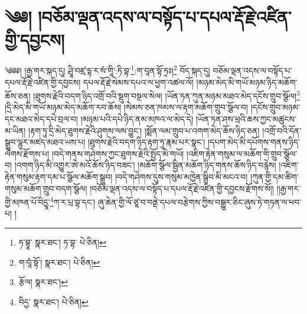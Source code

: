 \setcounter{footnote}{0} 
\chapter{༄༅། །བཅོམ་ལྡན་འདས་ལ་བསྟོད་པ་དཔལ་རྡོ་རྗེ་འཛིན་གྱི་དབྱངས།}༄༅༅། །རྒྱ་གར་སྐད་དུ། ཤྲཱི་བཛྲ་དྷ་ར་སཾ་གཱི་:ཏི་བྷ་\footnote{ཏ་བྷཱ་  སྣར་ཐང་། ཏ་བྷ་  པེ་ཅིན། }:ག་བཱན་སྟོ་ཏྲཿ།\footnote{ག་བཱཾ་སྟོ་།  སྣར་ཐང་།  པེ་ཅིན། } བོད་སྐད་དུ། བཅོམ་ལྡན་འདས་ལ་བསྟོད་པ་དཔལ་རྡོ་རྗེ་འཛིན་གྱི་དབྱངས། དཔལ་རྡོ་རྗེ་སེམས་དཔའ་ལ་ཕྱག་འཚལ་ལོ། །མཉམ་མེད་མི་གཡོ་མཉམ་ཉིད་མཆོག་ཆོས་ཅན། །ཐུགས་རྗེའི་བདག་ཉིད་འགྲོ་བའི་སྡུག་བསྔལ་སེལ། །ཡོན་ཏན་ཀུན་མཉམ་མཐའ་མེད་དངོས་གྲུབ་སྩོལ།\footnote{རྩོལ།  སྣར་ཐང་། } །དྲི་མེད་མི་གཡོ་མཉམ་མེད་མཆོག་རབ་ཆོས། །སེམས་ཅན་ཁམས་ལ་རྟག་མཆོག་གྲུབ་སྩོལ་བ། །དངོས་གྲུབ་མཉམ་དང་མཐའ་མེད་དཔེ་བྲལ་བ། །མཉམ་པའི་དཔེ་ཉིད་ནམ་མཁའ་ལ་མེད་དེ། །ཡོན་ཏན་ཤས་ཕྲའི་ཆས་ཀྱང་མཚུངས་མ་ཡིན། །རྟག་ཏུ་དྲི་མེད་ཐུགས་རྗེའི་ཤུགས་ལས་བྱུང་། །སྨོན་ལམ་གྲུབ་པ་འགག་མེད་ཆོས་ཉིད་ཅན། །འགྲོ་བའི་དོན་སྒྲུབ་ལྷུར་མཛད་མཐའ་ཡས་པ། །ཐུགས་རྗེའི་བདག་ཉིད་རྟག་ཏུ་རྣམ་པར་སྣང་། །དཔག་མེད་མི་དཔོགས་གནས་ཉིད་ལེགས་རྫོགས་པ། །བདེ་གནས་གཤེགས་ཀྱང་ཐུགས་རྗེའི་སྤྱོད་མི་གཡོ། །འཇིག་རྟེན་གསུམ་ལ་མཆོག་གི་གྲུབ་སྩོལ་བ། །འགག་ཉིད་མི་འགྱུར་ཨེ་མའོ་ཆོས་ཉིད་བཟང་། །མཆོག་སྩོལ་སྦྱིན་མཆོག་ཉིད་གནས་ཆོས་ཉིད་བརྙེས། །འཇིག་རྟེན་གསུམ་རྟག་དམ་པ་སྩོལ་མཆོག་སྒྲུབ། །བདེ་གཤེགས་དུས་གསུམ་མཁྱེན་སྒྲིབ་མི་མངའ་བ། །ཀུན་གྱི་དམ་ཚིག་གསུམ་མཆོག་གྲུབ་བདག་སྩོལ། །བཅོམ་ལྡན་འདས་ལ་བསྟོད་པ་དཔལ་རྡོ་རྗེ་འཛིན་གྱི་དབྱངས་རྫོགས་སོ།། །།རྒྱ་གར་གྱི་མཁན་པོ་བིདྱཱ་\footnote{བིདྱ་  སྣར་ཐང་།  པེ་ཅིན། }ཀ་ར་པྲ་བྷ་དང་། ཞུ་ཆེན་གྱི་ལོ་ཙཱ་བ་བནྡེ་དཔལ་བརྩེགས་ཀྱིས་བསྒྱུར་ཅིང་ཞུས་ཏེ་གཏན་ལ་ཕབ་པ། ། 